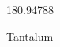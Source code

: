 \documentclass[12pt]{article}
\begin{document}
\hfill{}
\vfill
\begin{center}
  {\fontsize{50}{60}
  }

  \vspace{1em}

  180.94788

Tantalum
\end{center}
\vfill
\end{document}
